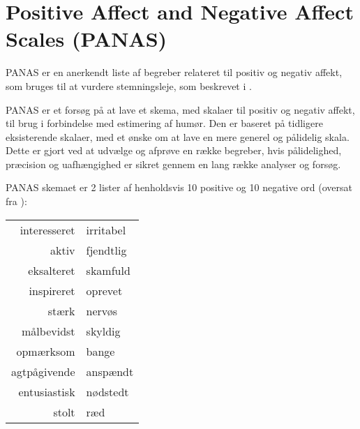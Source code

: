\section{Positive Affect and Negative Affect Scales (PANAS)}
PANAS er en anerkendt liste af begreber relateret til positiv og negativ affekt, som bruges til at vurdere stemningsleje, som beskrevet i \citet{panas}.


PANAS er et forsøg på at lave et skema, med skalaer til positiv og negativ affekt, til brug i forbindelse med estimering af humør.
Den er baseret på tidligere eksisterende skalaer, med et ønske om at lave en mere generel og pålidelig skala.
Dette er gjort ved at udvælge og afprøve en række begreber, hvis pålidelighed, præcision og uafhængighed er sikret gennem en lang række analyser og forsøg.

PANAS skemaet er 2 lister af henholdsvis 10 positive og 10 negative ord (oversat fra \citet{panas}):\\
\begin{center}
\begin{tabular}{r | l}
interesseret & irritabel \\\newline
aktiv & fjendtlig \\\newline
eksalteret & skamfuld \\\newline
inspireret & oprevet \\\newline
stærk & nervøs \\\newline
målbevidst & skyldig \\\newline
opmærksom & bange \\\newline
agtpågivende & anspændt \\\newline
entusiastisk & nødstedt \\\newline
stolt & ræd
\end{tabular}
\end{center}

